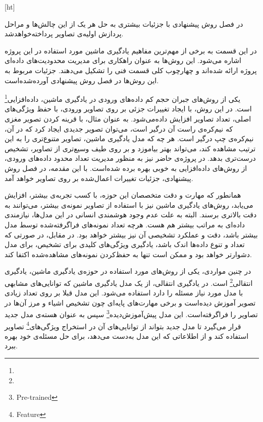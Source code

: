 [ht]


در فصل روش پیشنهادی با جزئیات بیشتری به حل هر یک از این چالش‌ها و مراحل پردازش اولیه‌ی تصاویر پرداخته‌خواهد‌شد.


در این قسمت به برخی از مهم‌ترین مفاهیم یادگیری ماشین مورد استفاده در این پروژه اشاره می‌شود.
این روش‌ها به عنوان راهکاری برای مدیریت محدودیت‌های داده‌ای پروژه ارائه شده‌اند و چهارچوب کلی قسمت فنی را تشکیل می‌دهند.
جزئیات مربوط به این روش‌ها در فصل روش پیشنهادی آورده‌شده‌است.


یکی از روش‌های جبران حجم کم داده‌های ورودی در یادگیری ماشین، 
داده‌افزایی\footnote{}
 است.
در این روش، با ایجاد تغییرات جزئی بر روی تصاویر ورودی، با حفظ ویژگی‌های اصلی، تعداد تصاویر افزایش داده‌می‌شود.
به عنوان مثال، با قرینه کردن تصویر مغزی که نیم‌کره‌ی راست آن درگیر است، می‌‌توان تصویر جدیدی ایجاد کرد که در آن، نیم‌کره‌ی چپ درگیر است.
هر چه که مدل یادگیری ماشین، تصاویر متنوع‌تری را به این ترتیب مشاهده کند، می‌تواند بهتر بیاموزد و بر روی طیف وسیع‌تری از تصاویر، تشخیص درست‌تری بدهد.
در پروژه‌ی حاضر نیز به منظور مدیریت تعداد محدود داده‌های ورودی، از روش‌های داده‌افزایی به خوبی بهره برده شده‌است.
با این مقدمه، در فصل روش پیشنهادی، جزئیات تغییرات اعمال‌شده بر روی تصاویر خواهد آمد.


همانطور که مهارت و دقت متخصصان این حوزه، با کسب تجربه‌ی بیشتر، افزایش می‌یابد،
روش‌های یادگیری ماشین نیز با استفاده از تصاویر نمونه‌ی بیشتر، می‌توانند به دقت بالاتری برسند.
البته به علت عدم وجود هوشمندی انسانی در این مدل‌ها، نیازمندی داده‌ای به مراتب بیشتر هم هست.
هرچه تعداد نمونه‌های فراگرفته‌شده توسط مدل بیشتر باشد، دقت و عملکرد تشخیصی آن نیز بیشتر خواهد بود.
در مقابل، در صورتی که تعداد و تنوع داده‌ها اندک باشد، یادگیری ویژگی‌های کلیدی برای تشخیص، برای مدل دشوارتر خواهد بود و ممکن است تنها به حفظ‌کردن نمونه‌های مشاهده‌شده اکتفا کند.

در چنین مواردی، یکی از روش‌های مورد استفاده در حوزه‌ی یادگیری ماشین، 
یادگیری انتقالی\footnote{}
 است.
در یادگیری انتقالی، از یک مدل یادگیری ماشین که توانایی‌های مشابهی با مدل مورد نیاز مسئله را دارد
استفاده می‌شود.
این مدل قبلا بر روی تعداد زیادی تصویر آموزش دیده‌است و برخی مهارت‌های پایه‌ای چون تشخیص اشیاء و مرز آن‌ها در تصاویر را فراگرفته‌است.
این مدل 
پیش‌آموزش‌دیده\footnote{Pre-trained}
سپس
به عنوان هسته‌ی مدل جدید قرار می‌گیرد تا مدل جدید بتواند از توانایی‌های آن در استخراج ویژگی‌های\footnote{Feature} تصاویر استفاده کند 
و از اطلاعاتی که این مدل به‌دست می‌دهد، برای حل مسئله‌ی خود بهره ببرد.

